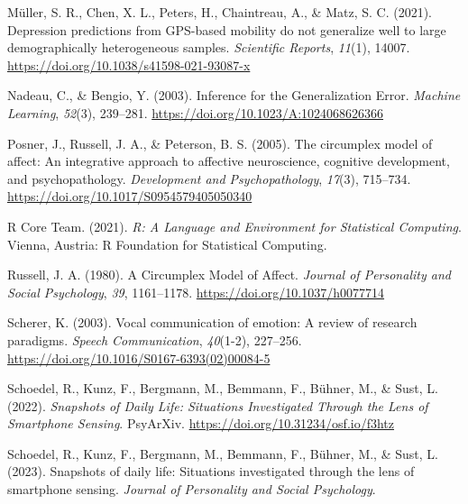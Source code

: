 \documentclass[
  english,
  man,floatsintext]{apa6}
\newlength{\cslhangindent}
\newenvironment{CSLReferences}[2] %
 {%
  \setlength{\parindent}{0pt}
  \ifodd #1 \everypar{\setlength{\hangindent}{\cslhangindent}}\ignorespaces\fi
  \ifnum #2 > 0
  \setlength{\parskip}{#2\baselineskip}
  \fi
 }%
 {}
\begin{document}
\begin{CSLReferences}{1}{0}
\leavevmode{}%
Müller, S. R., Chen, X. L., Peters, H., Chaintreau, A., \& Matz, S. C. (2021). Depression predictions from {GPS-based} mobility do not generalize well to large demographically heterogeneous samples. \emph{Scientific Reports}, \emph{11}(1), 14007. \url{https://doi.org/10.1038/s41598-021-93087-x}

\leavevmode{}%
Nadeau, C., \& Bengio, Y. (2003). Inference for the {Generalization Error}. \emph{Machine Learning}, \emph{52}(3), 239--281. \url{https://doi.org/10.1023/A:1024068626366}

\leavevmode{}%
Posner, J., Russell, J. A., \& Peterson, B. S. (2005). The circumplex model of affect: {An} integrative approach to affective neuroscience, cognitive development, and psychopathology. \emph{Development and Psychopathology}, \emph{17}(3), 715--734. \url{https://doi.org/10.1017/S0954579405050340}

\leavevmode{}%
R Core Team. (2021). \emph{R: {A Language} and {Environment} for {Statistical Computing}}. Vienna, Austria: R Foundation for Statistical Computing.

\leavevmode{}%
Russell, J. A. (1980). A {Circumplex Model} of {Affect}. \emph{Journal of Personality and Social Psychology}, \emph{39}, 1161--1178. \url{https://doi.org/10.1037/h0077714}

\leavevmode{}%
Scherer, K. (2003). Vocal communication of emotion: {A} review of research paradigms. \emph{Speech Communication}, \emph{40}(1-2), 227--256. \url{https://doi.org/10.1016/S0167-6393(02)00084-5}

\leavevmode{}%
Schoedel, R., Kunz, F., Bergmann, M., Bemmann, F., Bühner, M., \& Sust, L. (2022). \emph{Snapshots of {Daily Life}: {Situations Investigated Through} the {Lens} of {Smartphone Sensing}}. PsyArXiv. \url{https://doi.org/10.31234/osf.io/f3htz}

\leavevmode{}%
Schoedel, R., Kunz, F., Bergmann, M., Bemmann, F., Bühner, M., \& Sust, L. (2023). Snapshots of daily life: {Situations} investigated through the lens of smartphone sensing. \emph{Journal of Personality and Social Psychology}.


\end{CSLReferences}
\end{document}
